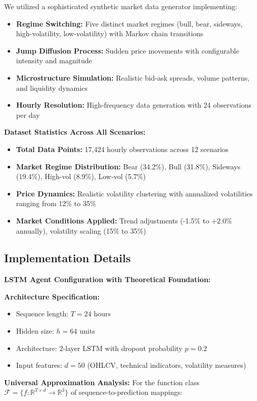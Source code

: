 \documentclass[11pt,a4paper]{article}
\begin{document}
We utilized a sophisticated synthetic market data generator implementing:
\begin{itemize}
\item \textbf{Regime Switching:} Five distinct market regimes (bull, bear, sideways, high-volatility, low-volatility) with Markov chain transitions
\item \textbf{Jump Diffusion Process:} Sudden price movements with configurable intensity and magnitude
\item \textbf{Microstructure Simulation:} Realistic bid-ask spreads, volume patterns, and liquidity dynamics
\item \textbf{Hourly Resolution:} High-frequency data generation with 24 observations per day

\end{itemize}
\textbf{Dataset Statistics Across All Scenarios:}
\begin{itemize}
\item \textbf{Total Data Points:} 17,424 hourly observations across 12 scenarios
\item \textbf{Market Regime Distribution:} Bear (34.2\%), Bull (31.8\%), Sideways (19.4\%), High-vol (8.9\%), Low-vol (5.7\%)
\item \textbf{Price Dynamics:} Realistic volatility clustering with annualized volatilities ranging from 12\% to 35\%
\item \textbf{Market Conditions Applied:} Trend adjustments (-1.5\% to +2.0\% annually), volatility scaling (15\% to 35\%)

\end{itemize}
\subsection{Implementation Details}

\textbf{LSTM Agent Configuration with Theoretical Foundation:}

\textbf{Architecture Specification:}
\begin{itemize}
\item Sequence length: $T = 24$ hours
\item Hidden size: $h = 64$ units  
\item Architecture: 2-layer LSTM with dropout probability $p = 0.2$
\item Input features: $d = 50$ (OHLCV, technical indicators, volatility measures)

\end{itemize}
\textbf{Universal Approximation Analysis:}
For the function class $\mathcal{F} = \{f: \mathbb{R}^{T \times d} \to \mathbb{R}^3\}$ of sequence-to-prediction mappings:
\end{document}

